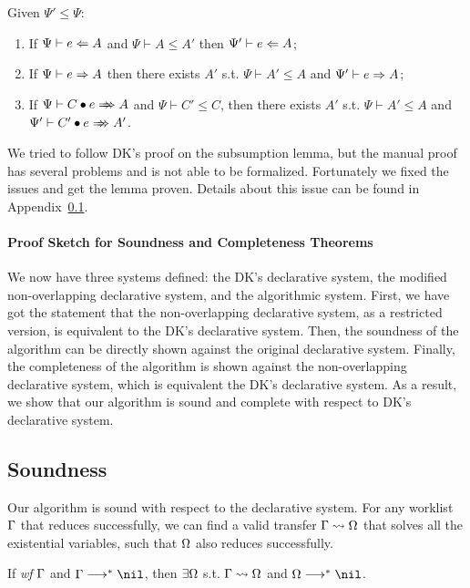 \begin{lemma}[Subsumption]
Given $\Psi' \le \Psi$:
\begin{enumerate}
    \item If $\Psi \vdash e \Leftarrow A$ and $\Psi \vdash A \le A'$ then $\Psi' \vdash e \Leftarrow A$;
    \item If $\Psi \vdash e \Rightarrow A$ then there exists
        $A'$ s.t. $\Psi \vdash A' \le A$ and $\Psi' \vdash e \Rightarrow A$;
    \item If $\Psi \vdash \appInf{C}{e}{A}$ and $\Psi \vdash C' \le C$,
        then there exists $A'$ s.t. $\Psi \vdash A' \le A$ and $\Psi' \vdash \appInf{C'}{e}{A'}$.
\end{enumerate}
\end{lemma}

We tried to follow DK's proof on the subsumption lemma,
but the manual proof has several problems and is not able to be formalized.
Fortunately we fixed the issues and get the lemma proven.
Details about this issue can be found in Appendix~\ref{}.

\paragraph{Proof Sketch for Soundness and Completeness Theorems}
We now have three systems defined: the DK's declarative system,
the modified non-overlapping declarative system, and the algorithmic system.
First, we have got the statement that the non-overlapping declarative system,
as a restricted version, is equivalent to the DK's declarative system.
Then, the soundness of the algorithm can be directly shown against the original declarative system.
Finally, the completeness of the algorithm is shown against the non-overlapping declarative system,
which is equivalent the DK's declarative system.
As a result, we show that our algorithm is sound and complete with respect to DK's declarative system.

\subsection{Soundness}

Our algorithm is sound with respect to the declarative system.
For any worklist $\Gamma$ that reduces successfully,
we can find a valid transfer $\Gamma\rightsquigarrow\Omega$ that solves all the existential variables,
such that $\Omega$ also reduces successfully.
\begin{theorem}[Soundness]
If \emph{wf }$\Gamma$ and $\Gm \redto \nil$, then $\exists \Omega$ s.t. $\Gamma\rightsquigarrow\Omega$ and $\Om\redto\nil$.
\end{theorem}

